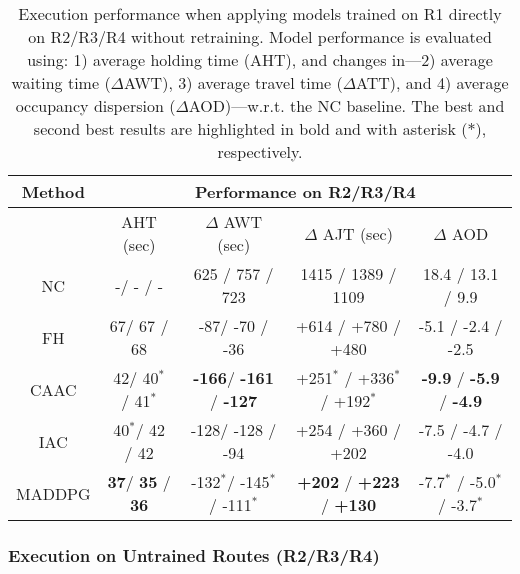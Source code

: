 \documentclass{article}
\begin{document}
\begin{table*}[!h]
\begin{center}
\footnotesize
\begin{tabular}{ c c c c c}
\toprule
{Method} &\multicolumn{4}{c}{Performance on R2/R3/R4}  \\
\midrule
~ & AHT (sec) &$ \Delta$ AWT (sec) & $ \Delta$ AJT (sec) &$ \Delta$ AOD \\
\midrule


NC &   -/ - / -
&   625 / 757 / 723
&   1415 / 1389 / 1109
&   18.4 / 13.1 / 9.9\\

FH &   67/ 67 / 68
&   -87/ -70 / -36
&   +614 / +780 / +480
&   -5.1 / -2.4 / -2.5\\

CAAC &  42/ 40$^\ast$ / 41$^\ast$
&  \textbf{-166}/  \textbf{-161} /  \textbf{-127}
&   +251$^\ast$ / +336$^\ast$ / +192$^\ast$
&    \textbf{-9.9} /  \textbf{-5.9} /  \textbf{-4.9}\\

IAC &   40$^\ast$/ 42 / 42
&   -128/ -128 / -94
&   +254 / +360 / +202
&   -7.5 / -4.7 / -4.0\\

MADDPG &    \textbf{37}/ \textbf{35} / \textbf{36}
&    -132$^\ast$/ -145$^\ast$ / -111$^\ast$
&    \textbf{+202} /  \textbf{+223} /  \textbf{+130}
&   -7.7$^\ast$ / -5.0$^\ast$ / -3.7$^\ast$\\

\bottomrule
\end{tabular}
\caption{Execution performance when applying models trained on R1 directly on R2/R3/R4 without retraining. Model performance is evaluated using: 1) average holding time (AHT), and changes in---2) average waiting time ($\Delta$AWT), 3) average travel time ($\Delta$ATT), and 4) average occupancy dispersion ($\Delta$AOD)---w.r.t. the NC baseline. The best and second best results are highlighted in bold and with asterisk ($*$), respectively.}\label{table:test}
\end{center}
\end{table*}








\subsubsection{Execution on Untrained Routes (R2/R3/R4)}
\end{document}
